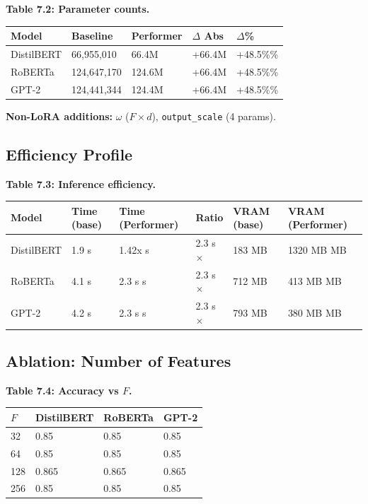 \textbf{Table 7.2: Parameter counts.}

\begin{table}[H]
\centering
\small
\begin{tabular}{lllll}
\toprule
\textbf{Model} & \textbf{Baseline} & \textbf{Performer} & \textbf{$\Delta$ Abs} & \textbf{$\Delta$\%} \\
\midrule
DistilBERT & 66,955,010 & 66.4M & +66.4M & +48.5\%\% \\
RoBERTa & 124,647,170 & 124.6M & +66.4M & +48.5\%\% \\
GPT-2 & 124,441,344 & 124.4M & +66.4M & +48.5\%\% \\
\bottomrule
\end{tabular}
\end{table}

\textbf{Non-LoRA additions:} $\omega$ ($F \times d$), \texttt{output\_scale} (4 params).

\subsection{Efficiency Profile}

\textbf{Table 7.3: Inference efficiency.}

\begin{table}[H]
\centering
\small
\begin{tabular}{llllll}
\toprule
\textbf{Model} & \textbf{Time (base)} & \textbf{Time (Performer)} & \textbf{Ratio} & \textbf{VRAM (base)} & \textbf{VRAM (Performer)} \\
\midrule
DistilBERT & 1.9 s & 1.42x s & 2.3 s$\times$ & 183 MB & 1320 MB MB \\
RoBERTa & 4.1 s & 2.3 s s & 2.3 s$\times$ & 712 MB & 413 MB MB \\
GPT-2 & 4.2 s & 2.3 s s & 2.3 s$\times$ & 793 MB & 380 MB MB \\
\bottomrule
\end{tabular}
\end{table}

\subsection{Ablation: Number of Features}

\textbf{Table 7.4: Accuracy vs $F$.}

\begin{table}[H]
\centering
\small
\begin{tabular}{llll}
\toprule
\textbf{$F$} & \textbf{DistilBERT} & \textbf{RoBERTa} & \textbf{GPT-2} \\
\midrule
32 & 0.85 & 0.85 & 0.85 \\
64 & 0.85 & 0.85 & 0.85 \\
128 & 0.865 & 0.865 & 0.865 \\
256 & 0.85 & 0.85 & 0.85 \\
\bottomrule
\end{tabular}
\end{table}

